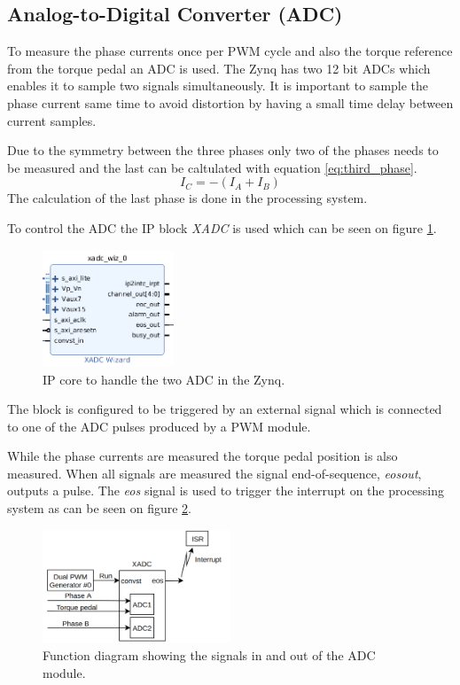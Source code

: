 \subsection{Analog-to-Digital Converter (ADC)}

To measure the phase currents once per PWM cycle and also the torque reference from the torque pedal an ADC is used. The Zynq has two 12 bit ADCs which enables it to sample two signals simultaneously. It is important to sample the phase current same time to avoid distortion by having a small time delay between current samples. 

Due to the symmetry between the three phases only two of the phases needs to be measured and the last can be caltulated with equation \ref{eq:third_phase}.
\begin{equation}
    I_C = -(I_A + I_B)
    \label{eq:third_phase}
\end{equation}
The calculation of the last phase is done in the processing system.

To control the ADC the IP block \textit{XADC} is used which can be seen on figure \ref{fig:adc_module}. 

\begin{figure}[H]
	\centering
	\includegraphics[width=0.35\textwidth]{pictures/software/adc.png}
	\caption{IP core to handle the two ADC in the Zynq.}
	\label{fig:adc_module}
\end{figure}

The block is configured to be triggered by an external signal which is connected to one of the ADC pulses produced by a PWM module.

While the phase currents are measured the torque pedal position is also measured. When all signals are measured the signal end-of-sequence, \textit{eos\textunderscore out}, outputs a pulse. The \textit{eos} signal is used to trigger the interrupt on the processing system as can be seen on figure \ref{fig:adc_block_diagram}.

\begin{figure}[H]
	\centering
	\includegraphics[width=0.5\textwidth]{pictures/software/adc_block_diagram.png}
	\caption{Function diagram showing the signals in and out of the ADC module.}
	\label{fig:adc_block_diagram}
\end{figure}



